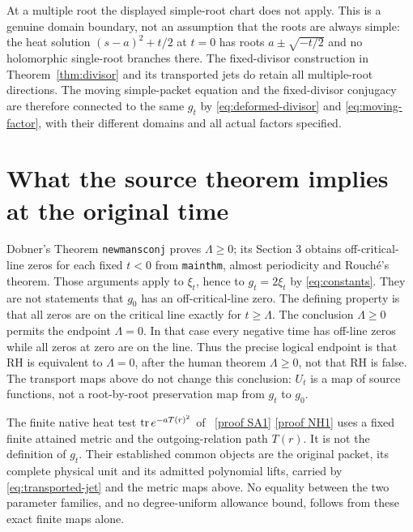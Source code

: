 \documentclass[11pt]{article}
\begin{document}
At a multiple root the displayed simple-root chart does not apply.
This is a genuine domain boundary, not an assumption that the roots
are always simple: the heat solution $(s-a)^2+t/2$ at $t=0$ has
roots $a\pm\sqrt{-t/2}$ and no holomorphic single-root branches
there. The fixed-divisor construction in
Theorem~\ref{thm:divisor} and its transported jets do retain all
multiple-root directions. The moving simple-packet equation and the
fixed-divisor conjugacy are therefore connected to the same $g_t$
by \eqref{eq:deformed-divisor} and \eqref{eq:moving-factor}, with
their different domains and all actual factors specified.

\section{What the source theorem implies at the original time}

Dobner's Theorem \texttt{newmansconj} proves $\Lambda\geq0$;
its Section 3 obtains off-critical-line zeros for each fixed $t<0$
from \texttt{mainthm}, almost periodicity and Rouch\'e's theorem.
Those arguments apply to $\xi_t$, hence to $g_t=2\xi_t$ by
\eqref{eq:constants}. They are not statements that $g_0$ has an
off-critical-line zero. The defining property is that all zeros
are on the critical line exactly for $t\geq\Lambda$.
The conclusion $\Lambda\geq0$ permits the endpoint $\Lambda=0$.
In that case every negative time has off-line zeros while all
zeros at zero are on the line. Thus the precise logical endpoint
is that RH is equivalent to $\Lambda=0$, after the human theorem
$\Lambda\geq0$, not that RH is false. The transport maps above
do not change this conclusion: $U_t$ is a map of source functions,
not a root-by-root preservation map from $g_t$ to $g_0$.

The finite native heat test $\operatorname{tr} e^{-aT(r)^2}$ of \cite{Native}%
~\href{https://github.com/KokunoYumeto/zeta-function-research-reader/blob/5992ad50c0f2a06921f1fcaded7b4e38097c0739/workbenches/splitzero-tandem/continuations/20260920-original-kernel-mixed-determinants/providers/NATIVE_SPECTRAL_ACTION.tex\#L31}{[proof SA1]} \href{https://github.com/KokunoYumeto/zeta-function-research-reader/blob/5992ad50c0f2a06921f1fcaded7b4e38097c0739/workbenches/splitzero-tandem/continuations/20260920-original-kernel-mixed-determinants/providers/NATIVE_HEAT_ACTION.tex\#L41}{[proof NH1]}%
{}
uses a fixed finite attained metric and the outgoing-relation path
$T(r)$. It is not the definition of $g_t$. Their established common
objects are the original packet, its complete physical unit and its
admitted polynomial lifts, carried by
\eqref{eq:transported-jet} and the metric maps above. No equality
between the two parameter families, and no degree-uniform allowance
bound, follows from these exact finite maps alone.
\end{document}
